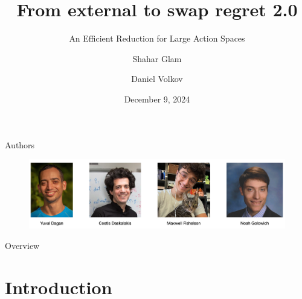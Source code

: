 \documentclass[aspectratio=169,xcolor=dvipsnames,t]{beamer}
\title[short title]{From external to swap regret 2.0} %
\subtitle{An Efficient Reduction for Large Action Spaces}
\author{Shahar Glam \and Daniel Volkov}
\institute[TAU] %
{
    Tel-Aviv University  %
}
\date{December 9, 2024} %
\begin{document}


\begin{frame}
    \titlepage
\end{frame}

\begin{frame}{Authors}
    \vfill\null
    \begin{figure}[h]
        \centering
        \includegraphics[width=1\linewidth]{Screenshot 2024-12-06 at 17.29.21.png}
    \end{figure}
    \vfill\null
\end{frame}

\begin{frame}[label=last]{Overview}
    \tableofcontents
\end{frame}

\section{Introduction}
\end{document}
